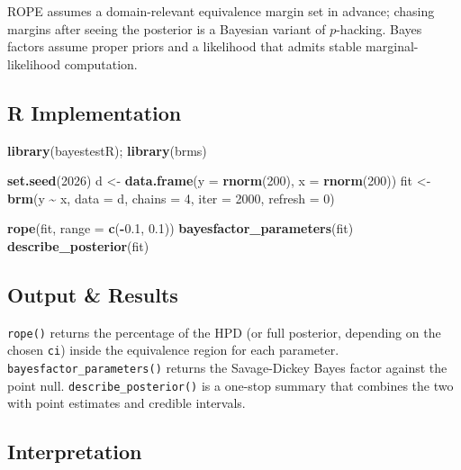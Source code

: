 \documentclass[
]{article}
\newenvironment{Shaded}{\begin{snugshade}}{\end{snugshade}}
\newcommand{\AttributeTok}[1]{\textcolor[rgb]{0.13,0.29,0.53}{#1}}
\newcommand{\DecValTok}[1]{\textcolor[rgb]{0.00,0.00,0.81}{#1}}
\newcommand{\FloatTok}[1]{\textcolor[rgb]{0.00,0.00,0.81}{#1}}
\newcommand{\FunctionTok}[1]{\textcolor[rgb]{0.13,0.29,0.53}{\textbf{#1}}}
\newcommand{\NormalTok}[1]{#1}
\newcommand{\OtherTok}[1]{\textcolor[rgb]{0.56,0.35,0.01}{#1}}
\newcommand{\SpecialCharTok}[1]{\textcolor[rgb]{0.81,0.36,0.00}{\textbf{#1}}}
\begin{document}
ROPE assumes a domain-relevant equivalence margin set in advance;
chasing margins after seeing the posterior is a Bayesian variant of
\(p\)-hacking. Bayes factors assume proper priors and a likelihood that
admits stable marginal-likelihood computation.

\subsection{R Implementation}\label{r-implementation}

\begin{Shaded}
\begin{Highlighting}[]
\FunctionTok{library}\NormalTok{(bayestestR); }\FunctionTok{library}\NormalTok{(brms)}

\FunctionTok{set.seed}\NormalTok{(}\DecValTok{2026}\NormalTok{)}
\NormalTok{d }\OtherTok{\textless{}{-}} \FunctionTok{data.frame}\NormalTok{(}\AttributeTok{y =} \FunctionTok{rnorm}\NormalTok{(}\DecValTok{200}\NormalTok{), }\AttributeTok{x =} \FunctionTok{rnorm}\NormalTok{(}\DecValTok{200}\NormalTok{))}
\NormalTok{fit }\OtherTok{\textless{}{-}} \FunctionTok{brm}\NormalTok{(y }\SpecialCharTok{\textasciitilde{}}\NormalTok{ x, }\AttributeTok{data =}\NormalTok{ d, }\AttributeTok{chains =} \DecValTok{4}\NormalTok{, }\AttributeTok{iter =} \DecValTok{2000}\NormalTok{, }\AttributeTok{refresh =} \DecValTok{0}\NormalTok{)}

\FunctionTok{rope}\NormalTok{(fit, }\AttributeTok{range =} \FunctionTok{c}\NormalTok{(}\SpecialCharTok{{-}}\FloatTok{0.1}\NormalTok{, }\FloatTok{0.1}\NormalTok{))}
\FunctionTok{bayesfactor\_parameters}\NormalTok{(fit)}
\FunctionTok{describe\_posterior}\NormalTok{(fit)}
\end{Highlighting}
\end{Shaded}

\subsection{Output \& Results}\label{output-results}

\texttt{rope()} returns the percentage of the HPD (or full posterior,
depending on the chosen \texttt{ci}) inside the equivalence region for
each parameter. \texttt{bayesfactor\_parameters()} returns the
Savage-Dickey Bayes factor against the point null.
\texttt{describe\_posterior()} is a one-stop summary that combines the
two with point estimates and credible intervals.

\subsection{Interpretation}\label{interpretation}
\end{document}
